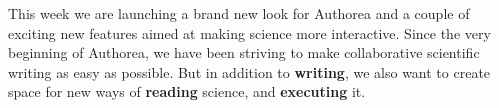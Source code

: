 This week we are launching a brand new look for Authorea and a couple of exciting new features aimed at making science more interactive. Since the very beginning of Authorea, we have been striving to make collaborative scientific writing as easy as possible. But in addition to \textbf{writing}, we also want to create space for new ways of \textbf{reading} science, and \textbf{executing} it.